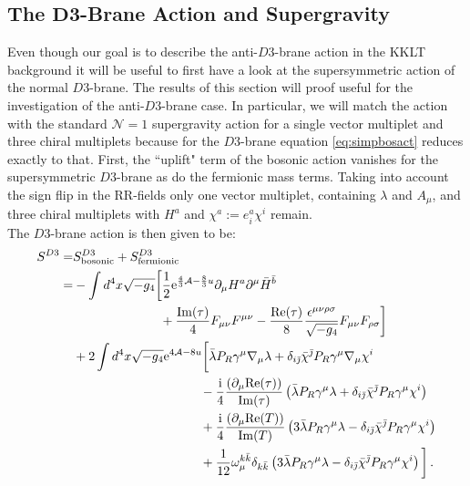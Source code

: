 \documentclass[a4paper,12pt,twoside,openright]{report}
\newcommand{\bea}{\begin{equation}\begin{aligned}}
\newcommand{\eea}{\end{aligned}\end{equation}}
\def\rmi{{\rm i}}
\def\rme{{\rm e}}
\def\jb{{\bar \jmath}}
\def\rmre{{\rm Re}}
\def\rmim{{\rm Im}}
\begin{document}
\subsection[The $D3$-Brane Action and Supergravity]{The $\mathbf{D3}$-Brane Action and Supergravity}
\label{sec:susyD3}
Even though our goal is to describe the anti-$D3$-brane action in the KKLT background it will be useful to first have a look at the supersymmetric action of the normal $D3$-brane. The results of this section will proof useful  for the investigation of the anti-$D3$-brane case. In particular, we will match the action with the standard $\mathcal{N}=1$ supergravity action for a single vector multiplet and three chiral multiplets because for the $D3$-brane equation \eqref{eq:simpbosact} reduces exactly to that. First, the ``uplift" term of the bosonic action vanishes for the supersymmetric $D3$-brane as do the fermionic mass terms. Taking into account the sign flip in the RR-fields only one vector multiplet, containing $\lambda$ and $A_\mu$, and three chiral multiplets with $H^a$ and $\chi^a := e^a_i \chi^i$ remain.\\
The $D3$-brane action is then given to be:
\bea 
S^{D3}
=& S^{D3}_{\text{bosonic}} + S^{D3}_{\text{fermionic}}\\
=& - \int d^4x \sqrt{-g_4} \bigg[ \frac{1}{2} \rme^{\frac{4}{3} \mathcal{A}-\frac{8}{3}u}\partial_\mu H^a \partial^\mu \bar{H}^{\bar{b}}\\
&\qquad\qquad\qquad\;\;\; + \frac{\rmim(\tau)}{4} F_{\mu\nu}F^{\mu\nu} - \frac{\rmre(\tau)}{8} \frac{\epsilon^{\mu\nu\rho\sigma}}{\sqrt{-g_4}} F_{\mu\nu}F_{\rho\sigma}\bigg]\\
& + 2 \int d^4x \sqrt{-g_4} \rme^{4\mathcal{A}-8u} \bigg[ \bar{\lambda} P_R \gamma^\mu \nabla_\mu \lambda + \delta_{i\jb} \bar{\chi}^\jb P_R \gamma^\mu \nabla_\mu \chi^i\\
&\qquad\qquad\qquad\qquad\qquad - \frac{\rmi}{4} \frac{\left(\partial_\mu \rmre(\tau)\right)}{\rmim(\tau)} \left( \bar{\lambda} P_R \gamma^\mu \lambda + \delta_{i\jb} \bar{\chi}^\jb P_R \gamma^\mu \chi^i\right)\\
&\qquad\qquad\qquad\qquad\qquad + \frac{\rmi}{4} \frac{\left(\partial_\mu \rmre(T)\right)}{\rmim(T)} \left(3 \bar{\lambda} P_R \gamma^\mu \lambda - \delta_{i\jb} \bar{\chi}^\jb P_R \gamma^\mu \chi^i\right)\\
&\qquad\qquad\qquad\qquad\qquad + \frac{1}{12} \omega_\mu^{k\bar{k}} \delta_{k\bar{k}} \left(3 \bar{\lambda} P_R \gamma^\mu \lambda - \delta_{i\jb} \bar{\chi}^\jb P_R \gamma^\mu \chi^i\right)\bigg]\,.
\label{eq:d3act}
\eea
\end{document}
